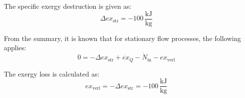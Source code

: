 The specific exergy destruction is given as:  
\[
\Delta ex_{\text{str}} = -100 \, \frac{\text{kJ}}{\text{kg}}
\]  

From the summary, it is known that for stationary flow processes, the following applies:  
\[
0 = -\Delta ex_{\text{str}} + \dot{ex}_Q - \dot{N}_{\text{in}} - ex_{\text{verl}}
\]  

The exergy loss is calculated as:  
\[
ex_{\text{verl}} = -\Delta ex_{\text{str}} = -100 \, \frac{\text{kJ}}{\text{kg}}
\]